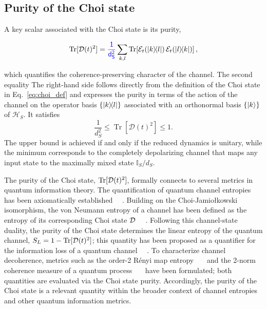 \documentclass[pra,twocolumn,aps,showpacs,superscriptaddress,longbibliography]{revtex4-2}%
\newcommand{\jami}{Choi-Jamiołkowski}
\providecommand{\DIFadd}[1]{{\protect\color{blue} \sf #1}} %
\providecommand{\DIFdel}[1]{{\protect\color{red} \scriptsize #1}} %
\providecommand{\DIFaddbegin}{} %
\providecommand{\DIFaddend}{} %
\providecommand{\DIFdelbegin}{} %
\providecommand{\DIFdelend}{} %
\begin{document}
\subsection{Purity of the Choi state}
A key scalar associated with the Choi state is its purity,
\DIFaddbegin 

\DIFaddend \begin{equation}\label{eq:choi:purity}
\operatorname{Tr}[\mathcal{D}(t)^2]
=
\DIFaddbegin \DIFadd{\frac{1}{d_S^2}
}\DIFaddend \sum_{k,l}\operatorname{Tr}\!\left[\mathcal{E}_t(\dyad{k}{l})\,\mathcal{E}_t(\dyad{l}{k})\right],
\end{equation}
\DIFaddbegin 

\DIFaddend which quantifies the coherence-preserving character of the channel. 
\DIFdelbegin \DIFdel{The second equality }\DIFdelend %
\DIFaddbegin \DIFadd{The right-hand side }\DIFaddend follows directly from the definition of the Choi state in Eq.~\eqref{eq:choi_def} and expresses the purity in terms of the action of the channel on the operator basis \(\{\dyad{k}{l}\}\) associated with an orthonormal basis \(\{\ket{k}\}\) of \(\mathcal{H}_S\). It satisfies
\[
\frac{1}{d_S^2}\le\operatorname{Tr}[\mathcal{D}(t)^2]\le 1.
\]
The upper bound is achieved if and only if the reduced dynamics is unitary, while the minimum corresponds to the completely depolarizing channel that maps any input state to the maximally mixed state $\mathbb{I}_S/d_S$.

\DIFaddbegin \DIFadd{The purity of the Choi state, $\text{Tr}[\mathcal{D}(t)^2]$, formally connects to several metrics in quantum information theory. The quantification of quantum channel entropies has been axiomatically established~\mbox{%
\cite{gour_2021_entropy}}\hskip0pt%
. Building on the \jami{} isomorphism, the von Neumann entropy of a channel has been defined as the entropy of its corresponding Choi state $\mathcal{D}$~\mbox{%
\cite{chu_2022_entropy}}\hskip0pt%
. Following this channel-state duality, the purity of the Choi state determines the linear entropy of the quantum channel, $S_L = 1 - \text{Tr}[\mathcal{D}(t)^2]$; this quantity has been proposed as a quantifier for the information loss of a quantum channel~\mbox{%
\cite{li_2025_quantifying}}\hskip0pt%
. To characterize channel decoherence, metrics such as the order-2 R\'enyi map entropy~\mbox{%
\cite{roga_2011_entropic} }\hskip0pt%
and the 2-norm coherence measure of a quantum process~\mbox{%
\cite{korzekwa_2018_coherifying} }\hskip0pt%
have been formulated; both quantities are evaluated via the Choi state purity. Accordingly, the purity of the Choi state is a relevant quantity within the broader context of channel entropies and other quantum information metrics.
}
\end{document}
